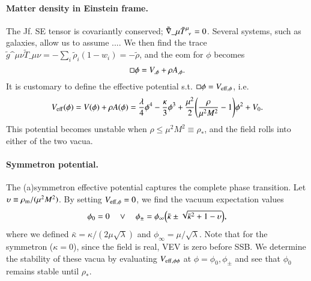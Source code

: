 \paragraph{Matter density in Einstein frame.} %
The Jf. SE tensor is covariantly conserved; $\tilde{\nabla}\_{\mu}\tilde{T}\indices{^{\mu}_{\nu}}=0$. Several systems, such as galaxies, allow us to assume  ....
We then find the trace $\tilde{g}\^{\mu\nu} \tilde{T}\_{\mu\nu}= -\sum_i \tilde{\rho}_i(1-w_i) =-\tilde{\rho}$, and the eom for $\phi$ becomes
\begin{equation}
    \sq \phi = V_{,\phi} + \rho A_{,\phi}.
\end{equation}
It is customary to define the effective potential s.t. $\sq \phi = V\ped{eff,\phi}$, i.e.
\begin{equation}
    V_\mathrm{eff}(\phi) = V(\phi) + \rho A(\phi) =  \frac{\lambda}{4} \phi^4 - \frac{\kappa}{3}\phi^3 + \frac{\mu^2}{2}{\left( \frac{\rho}{\mu^2M^2}-1 \right)} \phi^2 + V_0.
\end{equation}
\blahblah
This potential becomes unstable when $\rho\leq \mu^2M^2\equiv \rho_\ast$, and the field rolls into either of the two vacua. 


\paragraph{Symmetron potential.} %
    The (a)symmetron effective potential captures the complete phase transition. Let $\upsilon\equiv\rho_\mathrm{m}/(\mu^2M^2)$. By setting $V_\mathrm{eff,\phi}=0$, we find the vacuum expectation values
    \begin{equation}
        \phi_0 = 0 \quad \lor \quad \phi_\pm = \phi_\infty \pclosed{\bar{\kappa} \pm  \sqrt{\bar{\kappa}^2 +  1- \upsilon }},%
    \end{equation}
    where we defined $\bar{\kappa} = \kappa / (2\mu \sqrt{\lambda}) $ and $\phi_\infty = \mu/\sqrt{\lambda}$. Note that for the symmetron ($\kappa=0$), since the field is real, VEV is zero before SSB. We determine the stability of these vacua by evaluating $V_\mathrm{eff,\phi\phi}$ at $\phi=\phi_0,\phi_\pm$ and see that $\phi_0$ remains stable until $\rho_\ast$. 



